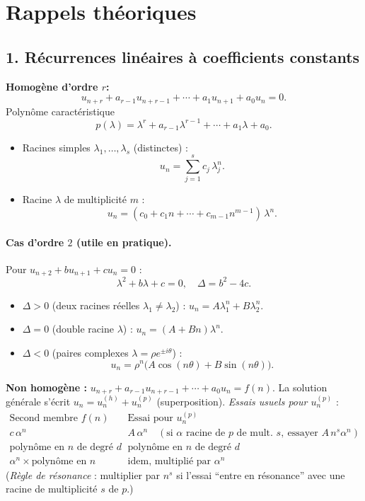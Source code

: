 
\section*{Rappels théoriques}

\subsection*{1. Récurrences linéaires à coefficients constants}
\textbf{Homogène d’ordre $r$:} 
\[
u_{n+r}+a_{r-1}u_{n+r-1}+\cdots+a_1u_{n+1}+a_0u_n=0.
\]
Polynôme caractéristique 
\[
p(\lambda)=\lambda^r+a_{r-1}\lambda^{r-1}+\cdots+a_1\lambda+a_0.
\]
\begin{itemize}
  \item Racines simples $\lambda_1,\dots,\lambda_s$ (distinctes) : 
  \[
  u_n=\sum_{j=1}^{s} c_j\,\lambda_j^n.
  \]
  \item Racine $\lambda$ de multiplicité $m$ : 
  \[
  u_n=(c_0+c_1 n+\cdots+c_{m-1}n^{m-1})\,\lambda^n.
  \]
\end{itemize}

\paragraph{Cas d’ordre $2$ (utile en pratique).}
Pour $u_{n+2}+bu_{n+1}+cu_n=0$ :
\[
\lambda^2+b\lambda+c=0,\quad \Delta=b^2-4c.
\]
\begin{itemize}
  \item $\Delta>0$ (deux racines réelles $\lambda_1\neq\lambda_2$) : $u_n=A\lambda_1^n+B\lambda_2^n$.
  \item $\Delta=0$ (double racine $\lambda$) : $u_n=(A+Bn)\lambda^n$.
  \item $\Delta<0$ (paires complexes $\lambda=\rho e^{\pm i\theta}$) : 
  \[
  u_n=\rho^n\big(A\cos(n\theta)+B\sin(n\theta)\big).
  \]
\end{itemize}

\textbf{Non homogène :} \quad 
\(
u_{n+r}+a_{r-1}u_{n+r-1}+\cdots+a_0u_n=f(n).
\)
La solution générale s’écrit $u_n=u_n^{(h)}+u_n^{(p)}$ (superposition). 
\textit{Essais usuels pour $u_n^{(p)}$} :
\[
\begin{array}{l|l}
\text{Second membre } f(n) & \text{Essai pour } u_n^{(p)} \\ \hline
c\,\alpha^n & A\,\alpha^n \quad (\text{si }\alpha \text{ racine de }p\text{ de mult. }s,\ \text{essayer } A\,n^s\alpha^n)\\
\text{polynôme en } n \text{ de degré }d & \text{polynôme en } n \text{ de degré }d\\
\alpha^n \times \text{polynôme en } n & \text{idem, multiplié par } \alpha^n
\end{array}
\]
(\textit{Règle de résonance} : multiplier par $n^s$ si l’essai “entre en résonance” avec une racine de multiplicité $s$ de $p$.)

